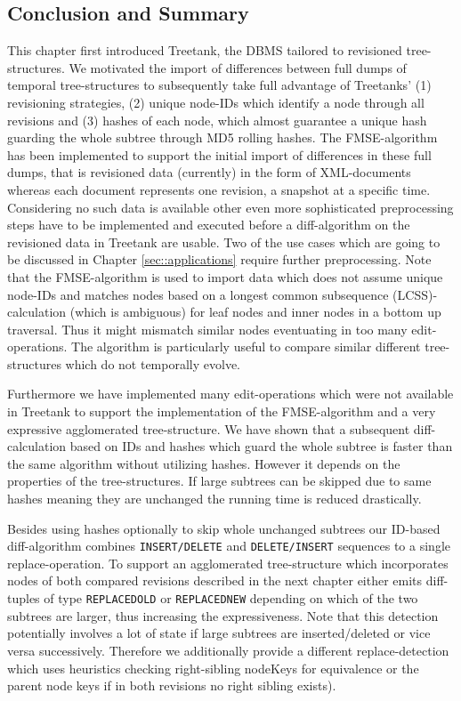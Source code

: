 
\subsection{Conclusion and Summary}
This chapter first introduced Treetank, the DBMS tailored to revisioned tree-structures. We motivated the import of differences between full dumps of temporal tree-structures to subsequently take full advantage of Treetanks' (1) revisioning strategies, (2) unique node-IDs which identify a node through all revisions and (3) hashes of each node, which almost guarantee a unique hash guarding the whole subtree through MD5 rolling hashes. The FMSE-algorithm has been implemented to support the initial import of differences in these full dumps, that is revisioned data (currently) in the form of XML-documents whereas each document represents one revision, a snapshot at a specific time. Considering no such data is available other even more sophisticated preprocessing steps have to be implemented and executed before a diff-algorithm on the revisioned data in Treetank are usable. Two of the use cases which are going to be discussed in Chapter \ref{sec::applications} require further preprocessing. Note that the FMSE-algorithm is used to import data which does not assume unique node-IDs and matches nodes based on a longest common subsequence (LCSS)-calculation (which is ambiguous) for leaf nodes and inner nodes in a bottom up traversal. Thus it might mismatch similar nodes eventuating in too many edit-operations. The algorithm is particularly useful to compare similar different tree-structures which do not temporally evolve.

Furthermore we have implemented many edit-operations which were not available in Treetank to support the implementation of the FMSE-algorithm and a very expressive agglomerated tree-structure. We have shown that a subsequent diff-calculation based on IDs and hashes which guard the whole subtree is faster than the same algorithm without utilizing hashes. However it depends on the properties of the tree-structures. If large subtrees can be skipped due to same hashes meaning they are unchanged the running time is reduced drastically.

Besides using hashes optionally to skip whole unchanged subtrees our ID-based diff-algorithm combines \texttt{INSERT/DELETE} and \texttt{DELETE/INSERT} sequences to a single replace-operation. To support an agglomerated tree-structure which incorporates nodes of both compared revisions described in the next chapter either emits diff-tuples of type \texttt{REPLACEDOLD} or \texttt{REPLACEDNEW} depending on which of the two subtrees are larger, thus increasing the expressiveness. Note that this detection potentially involves a lot of state if large subtrees are inserted/deleted or vice versa successively. Therefore we additionally provide a different replace-detection which uses heuristics checking right-sibling nodeKeys for equivalence or the parent node keys if in both revisions no right sibling exists).

